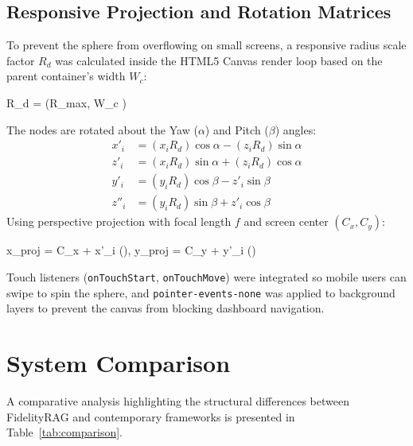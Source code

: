 \documentclass[11pt,journal,onecolumn]{article}
\begin{document}
\subsection{Responsive Projection and Rotation Matrices}
To prevent the sphere from overflowing on small screens, a responsive radius scale factor $R_d$ was calculated inside the HTML5 Canvas render loop based on the parent container's width $W_c$:
\begin{equation{}}
    R_d = \min\left(R_{max}, W_c \right)
\end{equation{}}
The nodes are rotated about the Yaw ($\alpha$) and Pitch ($\beta$) angles:
\begin{align}
    x'_i &= (x_i R_d) \cos\alpha - (z_i R_d) \sin\alpha \\
    z'_i &= (x_i R_d) \sin\alpha + (z_i R_d) \cos\alpha \\
    y'_i &= (y_i R_d) \cos\beta - z'_i \sin\beta \\
    z''_i &= (y_i R_d) \sin\beta + z'_i \cos\beta
\end{align}
Using perspective projection with focal length $f$ and screen center $(C_x, C_y)$:
\begin{equation{}}
    x_{proj} = C_x + x'_i \cdot \left(\right), \quad y_{proj} = C_y + y'_i \cdot \left(\right)
\end{equation{}}
Touch listeners (\texttt{onTouchStart}, \texttt{onTouchMove}) were integrated so mobile users can swipe to spin the sphere, and \texttt{pointer-events-none} was applied to background layers to prevent the canvas from blocking dashboard navigation.

\section{System Comparison}
A comparative analysis highlighting the structural differences between FidelityRAG and contemporary frameworks is presented in Table~\ref{tab:comparison}.
\end{document}
